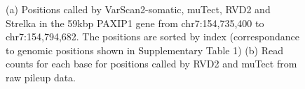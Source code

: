 \documentclass{bioinfo}
\begin{document}
\begin{figure}[!pthb]
\vspace{-10pt}
    \centering
    \caption{(a) Positions called by VarScan2-somatic, muTect, RVD2 and Strelka in the 59kbp PAXIP1 gene from chr7:154,735,400 to chr7:154,794,682. The positions are sorted by index (correspondance to genomic positions shown in Supplementary Table 1) (b) Read counts for each base for positions called by RVD2 and muTect from raw pileup data.}%
    \label{fig:brca_dot}%
\vspace{-10pt}
\end{figure}

\end{document}
